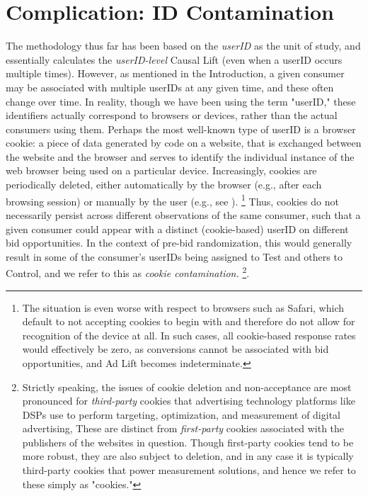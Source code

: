 \documentclass[11pt,a4paper]{article}
\theoremstyle{definition}
\theoremstyle{remark}
\theoremstyle{definition}
\theoremstyle{definition}
\theoremstyle{definition}
\theoremstyle{definition}
\theoremstyle{definition}
\theoremstyle{definition}
\begin{document}
\section{Complication: ID Contamination} \label{sec-contam}

The methodology thus far has been based on the \textit{userID} as the unit of study, and essentially calculates the \textit{userID-level} Causal Lift (even when a userID occurs multiple times). However, as mentioned in the Introduction, a given consumer may be associated with multiple userIDs at any given time, and these often change over time. 
In reality, though we have been using the term "userID," these identifiers actually correspond to browsers or devices, rather than the actual consumers using them. Perhaps the most well-known type of userID is a browser cookie: a piece of data generated by code on a website, that is exchanged between the website and the browser and serves to identify the individual instance of the web browser being used on a particular device. Increasingly, cookies are periodically deleted, either automatically by the browser (e.g., after each browsing session) or manually by the user (e.g., see \cite{comscore-2007}).
\footnote{The situation is even worse with respect to browsers such as Safari, which default to not accepting cookies to begin with and therefore do not  allow for recognition of the device at all. In such cases, all cookie-based response rates would effectively be zero, as conversions cannot be associated with bid opportunities, and Ad Lift becomes indeterminate.}
Thus, cookies do not necessarily persist across different observations of the same consumer, such that a given consumer could appear with a distinct (cookie-based) userID on different bid opportunities. In the context of pre-bid randomization, this would generally result in some of the consumer's userIDs being assigned to Test and others to Control, and we refer to this as \textit{cookie contamination.}
\footnote{Strictly speaking, the issues of cookie deletion and non-acceptance are most pronounced for {\em third-party} cookies that advertising technology platforms like DSPs use to perform targeting, optimization, and measurement of digital advertising, These are distinct from {\em first-party} cookies associated with the publishers of the websites in question. Though first-party cookies tend to be more robust, they are also subject to deletion, and in any case it is typically third-party cookies that power measurement solutions, and hence we refer to these simply as "cookies."}.
\end{document}
